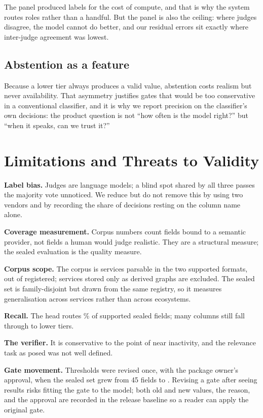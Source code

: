 \documentclass[journal]{IEEEtran}
\begin{document}
The panel produced \LabelFields{} labels for the cost of compute, and
that is why the system routes \RoutableRoles{} roles rather than a
handful. But the panel is also the ceiling: where judges disagree, the
model cannot do better, and our residual errors sit exactly where
inter-judge agreement was lowest.

\subsection{Abstention as a feature}

Because a lower tier always produces a valid value, abstention costs
realism but never availability. That asymmetry justifies gates that
would be too conservative in a conventional classifier, and it is why we
report precision on the classifier's own decisions: the product question
is not ``how often is the model right?'' but ``when it speaks, can we
trust it?''

\section{Limitations and Threats to Validity}
\label{sec:limitations}

\textbf{Label bias.} Judges are language models; a blind spot shared by
all three passes the majority vote unnoticed. We reduce but do not
remove this by using two vendors and by recording the share of decisions
resting on the column name alone.

\textbf{Coverage measurement.} Corpus numbers count fields bound to a
semantic provider, not fields a human would judge realistic. They are a
structural measure; the sealed evaluation is the quality measure.

\textbf{Corpus scope.} The corpus is \CorpusServices{} services parsable
in the two supported formats, out of \RegistryServices{} registered;
services stored only as derived graphs are excluded. The sealed set is
family-disjoint but drawn from the same registry, so it measures
generalisation across services rather than across ecosystems.

\textbf{Recall.} The head routes \SupportedRecall\% of supported sealed
fields; many columns still fall through to lower tiers.

\textbf{The verifier.} It is conservative to the point of near
inactivity, and the relevance task as posed was not well defined.

\textbf{Gate movement.} Thresholds were revised once, with the package
owner's approval, when the sealed set grew from 45 fields to
\SealedRows{}. Revising a gate after seeing results risks fitting the
gate to the model; both old and new values, the reason, and the approval
are recorded in the release baseline so a reader can apply the original
gate.
\end{document}
